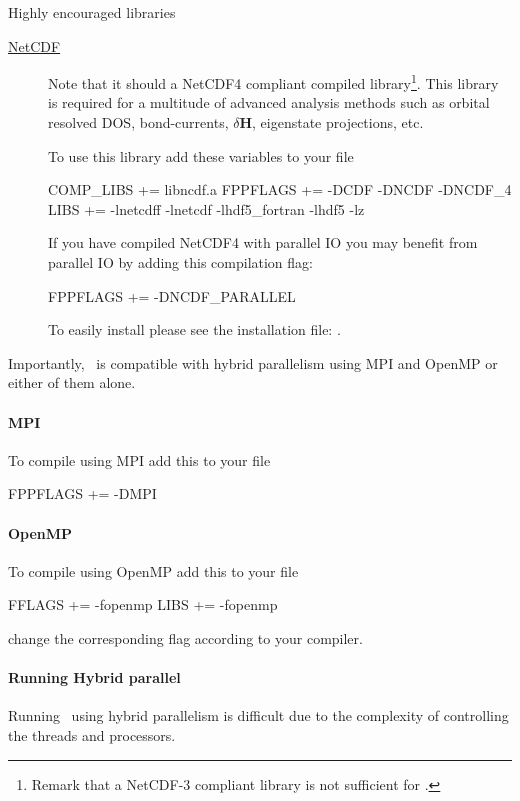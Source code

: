 Highly encouraged libraries
\begin{description}
  \item[\href{https://www.unidata.ucar.edu/software/netcdf}{NetCDF}] %
  Note that it should a NetCDF4 compliant compiled
  library\footnote{Remark that a NetCDF-3 compliant library is not
      sufficient for \tbtrans.}. This library is required for a
  multitude of advanced analysis methods such as orbital resolved DOS,
  bond-currents, $\delta \mathbf H$, eigenstate projections, etc.

  To use this library add these variables to your 
  file
\begin{shellexample}
  COMP_LIBS += libncdf.a
  FPPFLAGS += -DCDF -DNCDF -DNCDF_4
  LIBS += -lnetcdff -lnetcdf -lhdf5_fortran -lhdf5 -lz
\end{shellexample}

  If you have compiled NetCDF4 with parallel IO you may benefit from
  parallel IO by adding this compilation flag:
\begin{shellexample}
  FPPFLAGS += -DNCDF_PARALLEL
\end{shellexample}

  To easily install  please see the installation file:
  .
  
\end{description}

Importantly, \tbtrans\ is compatible with hybrid parallelism using MPI
and OpenMP or either of them alone. 

\paragraph{MPI}
To compile using MPI add this to your  file
\begin{shellexample}
 FPPFLAGS += -DMPI
\end{shellexample}

\paragraph{OpenMP}
To compile using OpenMP add this to your  file
\begin{shellexample}
 FFLAGS += -fopenmp
 LIBS += -fopenmp
\end{shellexample}
change the corresponding flag according to your compiler.

\paragraph{Running Hybrid parallel \tbtrans}
%
Running \tbtrans\ using hybrid parallelism is difficult due to the
complexity of controlling the threads and processors.

